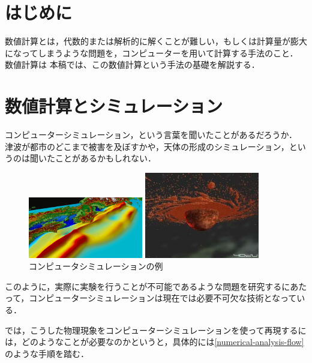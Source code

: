 
\section{はじめに}
数値計算とは，代数的または解析的に解くことが難しい，もしくは計算量が膨大になってしまうような問題を，コンピューターを用いて計算する手法のこと．
数値計算は
本稿では、この数値計算という手法の基礎を解説する．

\section{数値計算とシミュレーション}
コンピューターシミュレーション，という言葉を聞いたことがあるだろうか．
津波が都市のどこまで被害を及ぼすかや，天体の形成のシミュレーション，というのは聞いたことがあるかもしれない．

\begin{figure}[htbp]
	\begin{minipage}[t]{0.45\hsize}
        \centering
        \includegraphics[width=5cm]{img/jamstec-kei-tsunami.png}
    \end{minipage}
	\begin{minipage}[t]{0.45\hsize}
        \centering
    	\includegraphics[width=5cm]{img/4d2u-giant-impact.jpg}
    \end{minipage}
    \caption{コンピュータシミュレーションの例}
\end{figure}

このように，実際に実験を行うことが不可能であるような問題を研究するにあたって，コンピューターシミュレーションは現在では必要不可欠な技術となっている．

では，こうした物理現象をコンピューターシミュレーションを使って再現するには，どのようなことが必要なのかというと，具体的には\ref{numerical-analysis-flow}のような手順を踏む．

